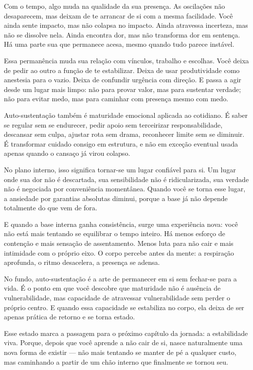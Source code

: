 \documentclass[12pt]{book}
\begin{document}
Com o tempo, algo muda na qualidade da sua presença. As oscilações não desaparecem, mas deixam de te arrancar de si com a mesma facilidade. Você ainda sente impacto, mas não colapsa no impacto. Ainda atravessa incerteza, mas não se dissolve nela. Ainda encontra dor, mas não transforma dor em sentença. Há uma parte sua que permanece acesa, mesmo quando tudo parece instável.

Essa permanência muda sua relação com vínculos, trabalho e escolhas. Você deixa de pedir ao outro a função de te estabilizar. Deixa de usar produtividade como anestesia para o vazio. Deixa de confundir urgência com direção. E passa a agir desde um lugar mais limpo: não para provar valor, mas para sustentar verdade; não para evitar medo, mas para caminhar com presença mesmo com medo.

Auto-sustentação também é maturidade emocional aplicada ao cotidiano. É saber se regular sem se endurecer, pedir apoio sem terceirizar responsabilidade, descansar sem culpa, ajustar rota sem drama, reconhecer limite sem se diminuir. É transformar cuidado consigo em estrutura, e não em exceção eventual usada apenas quando o cansaço já virou colapso.

No plano interno, isso significa tornar-se um lugar confiável para si. Um lugar onde sua dor não é descartada, sua sensibilidade não é ridicularizada, sua verdade não é negociada por conveniência momentânea. Quando você se torna esse lugar, a ansiedade por garantias absolutas diminui, porque a base já não depende totalmente do que vem de fora.

E quando a base interna ganha consistência, surge uma experiência nova: você não está mais tentando se equilibrar o tempo inteiro. Há menos esforço de contenção e mais sensação de assentamento. Menos luta para não cair e mais intimidade com o próprio eixo. O corpo percebe antes da mente: a respiração aprofunda, o ritmo desacelera, a presença se adensa.

No fundo, auto-sustentação é a arte de permanecer em si sem fechar-se para a vida. É o ponto em que você descobre que maturidade não é ausência de vulnerabilidade, mas capacidade de atravessar vulnerabilidade sem perder o próprio centro. E quando essa capacidade se estabiliza no corpo, ela deixa de ser apenas prática de retorno e se torna estado.

Esse estado marca a passagem para o próximo capítulo da jornada: a estabilidade viva. Porque, depois que você aprende a não cair de si, nasce naturalmente uma nova forma de existir --- não mais tentando se manter de pé a qualquer custo, mas caminhando a partir de um chão interno que finalmente se tornou seu.
\end{document}
